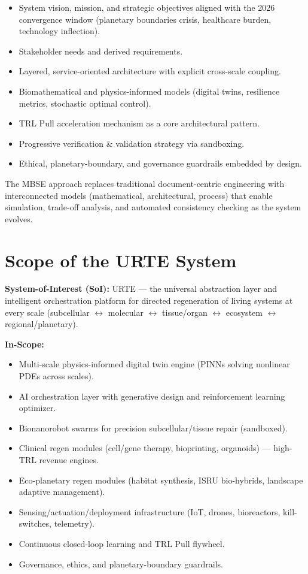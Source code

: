 \documentclass[11pt,a4paper]{report}
\begin{document}
\begin{itemize}[leftmargin=*]
    \item System vision, mission, and strategic objectives aligned with the 2026 convergence window (planetary boundaries crisis, healthcare burden, technology inflection).
    \item Stakeholder needs and derived requirements.
    \item Layered, service-oriented architecture with explicit cross-scale coupling.
    \item Biomathematical and physics-informed models (digital twins, resilience metrics, stochastic optimal control).
    \item TRL Pull acceleration mechanism as a core architectural pattern.
    \item Progressive verification \& validation strategy via sandboxing.
    \item Ethical, planetary-boundary, and governance guardrails embedded by design.
\end{itemize}

The MBSE approach replaces traditional document-centric engineering with interconnected models (mathematical, architectural, process) that enable simulation, trade-off analysis, and automated consistency checking as the system evolves.

\section{Scope of the URTE System}

\textbf{System-of-Interest (SoI):} URTE --- the universal abstraction layer and intelligent orchestration platform for directed regeneration of living systems at every scale (subcellular $\leftrightarrow$ molecular $\leftrightarrow$ tissue/organ $\leftrightarrow$ ecosystem $\leftrightarrow$ regional/planetary).

\textbf{In-Scope:}
\begin{itemize}
    \item Multi-scale physics-informed digital twin engine (PINNs solving nonlinear PDEs across scales).
    \item AI orchestration layer with generative design and reinforcement learning optimizer.
    \item Bionanorobot swarms for precision subcellular/tissue repair (sandboxed).
    \item Clinical regen modules (cell/gene therapy, bioprinting, organoids) --- high-TRL revenue engines.
    \item Eco-planetary regen modules (habitat synthesis, ISRU bio-hybrids, landscape adaptive management).
    \item Sensing/actuation/deployment infrastructure (IoT, drones, bioreactors, kill-switches, telemetry).
    \item Continuous closed-loop learning and TRL Pull flywheel.
    \item Governance, ethics, and planetary-boundary guardrails.
\end{itemize}
\end{document}
